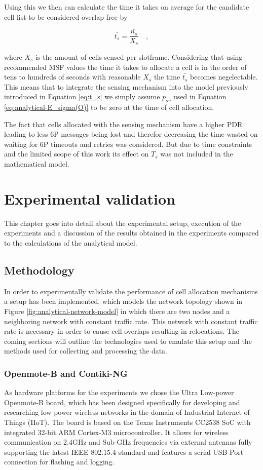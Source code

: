 \documentclass{comnets-thesis}
\begin{document}
Using this we then can calculate the time it takes on average for the candidate cell list to be considered overlap free by

\begin{equation}
    \bar{t_s} = \frac{\bar{n_s}}{X_s} \quad ,
 \end{equation}

where $X_s$ is the amount of cells sensed per slotframe.
Considering that using recommended \ac{MSF} values the time it takes to allocate a cell is in the order of tens to hundreds of seconds with reasonable $X_s$ the time $\bar{t_s}$ becomes negelectable. This means that to integrate the sensing mechanism into the model previously introduced in Equation \ref{eq:t_s} we simply assume $p_{ov}$ used in Equation \ref{eq:analytical-E_sigma(O)} to be zero at the time of cell allocation.

The fact that cells allocated with the sensing mechanism have a higher \ac{PDR} leading to less \ac{6P} messages being lost and therefor decreasing the time wasted on waiting for \ac{6P} timeouts and retries was considered. But due to time constraints and the limited scope of this work its effect on $T_s$ was not included in the mathematical model.



\chapter{Experimental validation}\label{chp:implementation}
This chapter goes into detail about the experimental setup, execution of the experiments and a discussion of the results obtained in the experiments compared to the calculations of the analytical model.

\section{Methodology}
In order to experimentally validate the performance of cell allocation mechanisms a setup has been implemented, which models the network topology shown in Figure \ref{fig:analytical-network-model} in which there are two nodes and a neighboring network with constant traffic rate. This network with constant traffic rate is necessary in order to cause cell overlaps resulting in relocations. The coming sections will outline the technologies used to emulate this setup and the methods used for collecting and processing the data.


\subsection{ Openmote-B and Contiki-NG}
As hardware platforms for the experiments we chose the Ultra Low-power Openmote-B board, which has been designed specifically for developing and researching low power wireless networks in the domain of Industrial Internet of Things (IIoT).
The board is based on the Texas Instruments CC2538 \ac{SoC} with integrated 32-bit ARM Cortex-M3 microcontroller. It allows for wireless communication on 2.4GHz and Sub-GHz frequencies via external antennas fully supporting the latest IEEE 802.15.4 standard and features a serial USB-Port connection for flashing and logging.
\end{document}
